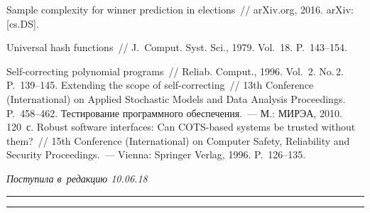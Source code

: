 \begin{multicols}{2}
{{\begin{thebibliography}{99}
      Sample complexity for winner prediction in elections~// 
arXiv.org, 2016. \mbox{arXiv}: [cs.DS]. 
    
    
      Universal hash functions~// J.~Comput. Syst. Sci., 1979. 
Vol.~18. P.~143--154.

      Self-correcting polynomial programs~// Reliab. 
Comput., 1996. Vol.~2. No.\,2. P.~139--145.
      Extending the scope of self-correcting~// 13th Conference 
(International) on Applied Stochastic Models and Data Analysis Proceedings. P.~458--462.
      Тестирование про\-грам\-мно\-го обеспечения.~--- 
М.: МИРЭА, 2010. 120~с.
      Robust software interfaces: Can COTS-based 
systems be trusted without them?~// 15th Conference (International) on Computer Safety, 
Reliability and Security Proceedings.~--- Vienna: Springer Verlag, 1996. P.~126--135.
     
 \end{thebibliography}

 }
 }

\end{multicols}

\vspace*{-3pt}

\hfill{\small\textit{Поступила в~редакцию 10.06.18}}

\vspace*{8pt}




\hrule

\vspace*{2pt}

\hrule


\def\tit{USING A PROBABILISTIC CALCULATION MODEL TO~TEST\\ ONE CLASS 
OF~READY-TO-USE SOFTWARE COMPONENTS\\ OF~LOCAL AND~NETWORK SYSTEMS}

\def\titkol{Using a probabilistic calculation model to test one class of 
ready-to-use software components of local and network systems}

